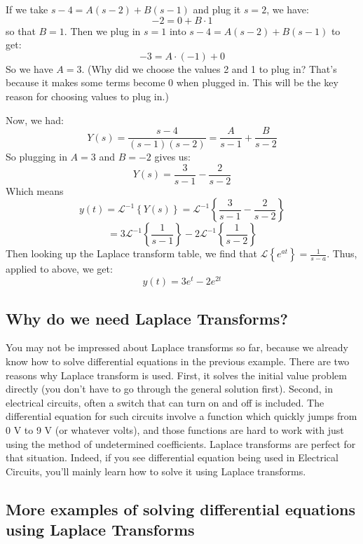 \documentclass[12pt]{report}
\begin{document}
If we take $s-4 = A(s-2)+B(s-1) $ and plug it $s=2$, we have:
$$-2 = 0+B\cdot 1$$
so that $B=1$. Then we plug in $s=1$ into $s-4 = A(s-2)+B(s-1) $ to get:
$$ -3 = A\cdot(-1)+0$$
So we have $A=3$. (Why did we choose the values 2 and 1 to plug in? That's because it makes some terms become 0 when plugged in. This will be the key reason for choosing values to plug in.)

Now, we had:
$$Y(s) = \frac{s-4}{(s-1)(s-2)} = \frac{A}{s-1}+\frac{B}{s-2} $$
So plugging in $A=3$ and $B=-2$ gives us:
$$Y(s) = \frac{3}{s-1}-\frac{2}{s-2} $$
Which means
$$y(t) = \mathscr{L}^{-1} \left\{ Y(s) \right\} = \mathscr{L}^{-1} \left\{ \frac{3}{s-1}-\frac{2}{s-2} \right\} $$
$$= 3\mathscr{L}^{-1} \left\{ \frac{1}{s-1} \right\} - 2\mathscr{L}^{-1} \left\{ \frac{1}{s-2} \right\}$$
Then looking up the Laplace transform table, we find that $ \mathscr{L} \left\{e^{at} \right\}= \frac{1}{s-a}$. Thus, applied to above, we get:
$$y(t) = 3 e^t -2 e^{2t} $$

\subsection*{Why do we need Laplace Transforms?}
You may not be impressed about Laplace transforms so far, because we already know how to solve differential equations in the previous example. There are two reasons why Laplace transform is used. First, it solves the initial value problem directly (you don't have to go through the general solution first). Second, in electrical circuits, often a switch that can turn on and off is included. The differential equation for such circuits involve a function which quickly jumps from 0 V to 9 V (or whatever volts), and those functions are hard to work with just using the method of undetermined coefficients. Laplace transforms are perfect for that situation. Indeed, if you see differential equation being used in Electrical Circuits, you'll mainly learn how to solve it using Laplace transforms.


\subsection*{More examples of solving differential equations using Laplace Transforms }
\end{document}
